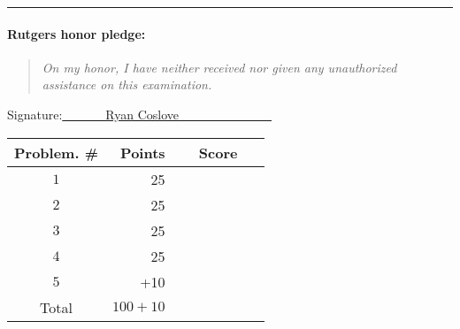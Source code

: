 \documentclass{article}
\theoremstyle{definition}
\def\fline{\rule{0.75\linewidth}{0.5pt}}
\newcommand{\finishline}{\vspace{-15pt}\begin{center}\fline\end{center}}
\begin{document}
\finishline

\paragraph{Rutgers honor pledge:} 

\begin{quote}
\emph{On my honor, I have neither received nor given any unauthorized assistance on this
examination.} 
\end{quote}
\hfill{Signature:\underline{~~~~~~~Ryan Coslove~~~~~~~~~~~~~~~}}

\bigskip

\begin{center}
\begin{tabular}{|c|r|c|}
\hline
Problem. \# & Points & Score \\ \hline\hline
$1$ & 25 & ~~~~~~~~~~~\\  \hline
$2$ & 25 & \\ \hline
$3$ & 25 & \\ \hline
$4$ & 25 & \\ \hline
$5$ & +10 & \\ \hline
Total & $100 + 10$ & \\ \hline
\end{tabular}
\end{center}

\newpage
\end{document}
